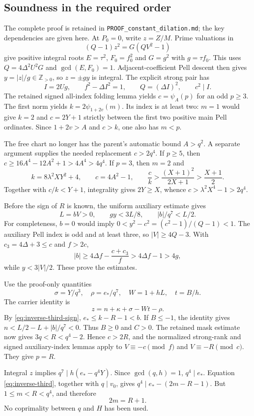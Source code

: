 \subsection{Soundness in the required order}
The complete proof is retained in
\texttt{PROOF\_constant\_dilation.md}; the key dependencies are given here.
At $P_0=0$, write $z=Z/M$. Prime valuations in
\[
 (Q-1)z^2=G(QV^2-1)
\]
give positive integral roots $E=\tau^2$, $F_0=f_0^2$ and
$G=g^2$ with $g=\tau f_0$. This uses $Q=4\Delta^2U^2G$ and
$\gcd(E,F_0)=1$. Adjacent-coefficient Pell descent then gives
$y=|z|/g\in\mathbb Z_{>0}$, so $z=\pm gy$ is integral.
The explicit strong pair has
\[
 I=2Ug,\qquad f^2-\Delta I^2=1,\qquad Q=(\Delta I)^2,\qquad c^2\mid I.
\]
The retained signed all-index folding lemma yields
$c=\psi_A(p)$ for an odd $p\ge3$. The first norm yields
$k=2\psi_{1+2v}(m)$. Its index is at least two: $m=1$ would give
$k=2$ and $c=2Y+1$ strictly between the first two positive main Pell
ordinates. Since $1+2v>A$ and $c>k$, one also has $m<p$.

The free chart no longer has the parent's automatic bound $A>q^2$.
A separate argument supplies the needed replacement $c>2q^4$.
If $p\ge5$, then $c\ge16A^4-12A^2+1>4A^4>4q^4$.
If $p=3$, then $m=2$ and
\[
 k=8\lambda^2XY^2+4,\qquad c=4A^2-1,\qquad
 \frac ck>\frac{(X+1)^2}{2X+1}>\frac{X+1}{2}.
\]
Together with $c/k<Y+1$, integrality gives $2Y\ge X$, whence
$c>\lambda^2X^4-1>2q^4$.

Before the sign of $R$ is known, the uniform auxiliary estimate gives
\[
 L=bV>0,\qquad gy<3L/8,\qquad |b|/q^7<L/2.
\]
For completeness, $b=0$ would imply
$0<y^2-c^2=(c^2-1)/(Q-1)<1$. The auxiliary Pell index is odd and at
least three, so $|V|\ge4Q-3$. With $c_3=4\Delta+3\le c$ and $f>2c$,
\[
 |b|\ge4\Delta f-\frac{c+c_3}{f}>4\Delta f-1>4g,
\]
while $y<3|V|/2$. These prove the estimates.

Use the proof-only quantities
\[
 \sigma=Y/q^3,\quad \rho=e_*/q^7,\quad W=1+hL,\quad t=B/h.
\]
The carrier identity is
\[
 z=n+\kappa+\sigma-Wt-\rho.
\]
By \eqref{eq:inverse-third-sign}, $e_*\le k-R-1<b$.
If $B\le-1$, the identity gives
$n<L/2-L+|b|/q^7<0$. Thus $B\ge0$ and $C>0$.
The retained mask estimate now gives $3q<R<q^4-2$.
Hence $c>2R$, and the normalized strong-rank and signed auxiliary-index
lemmas apply to $V\equiv-c\pmod f$ and $V\equiv-R\pmod c$.
They give $p=R$.

Integral $z$ implies $q^7\mid h(e_*-q^4Y)$. Since $\gcd(q,h)=1$,
$q^4\mid e_*$. Equation \eqref{eq:inverse-third}, together with $q\mid v_0$,
gives $q^4\mid e_*-(2m-R-1)$. But $1\le m<R<q^4$, and therefore
\[
 2m=R+1.
\]
No coprimality between $q$ and $H$ has been used.

